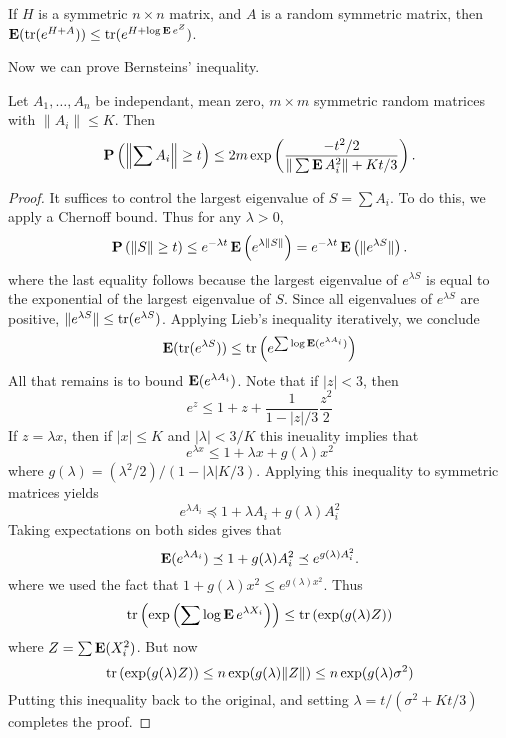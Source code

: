 \begin{corollary}
    If $H$ is a symmetric $n \times n$ matrix, and $A$ is a random symmetric matrix, then $\operatorname{\mathbf{E}}(\operatorname{\text{tr}}(e^{H + A})) \leq \operatorname{\text{tr}}(e^{H + \log \operatorname{\mathbf{E}} e^Z})$.
\end{corollary}

Now we can prove Bernsteins' inequality.

\begin{theorem}
    Let $A_1, \dots, A_n$ be independant, mean zero, $m \times m$ symmetric random matrices with $\| A_i \| \leq K$. Then
    \[ \operatorname{\mathbf{P}} \left( \left\| \sum A_i \right\| \geq t \right) \leq 2m \exp \left( \frac{-t^2/2}{\|\sum \operatorname{\mathbf{E}} A_i^2 \| + Kt/3} \right). \]
\end{theorem}
\begin{proof}
    It suffices to control the largest eigenvalue of $S = \sum A_i$. To do this, we apply a Chernoff bound. Thus for any $\lambda > 0$,
    \[ \operatorname{\mathbf{P}} \left( \| S \| \geq t \right) \leq e^{- \lambda t} \operatorname{\mathbf{E}} \left( e^{\lambda \| S \|} \right) = e^{-\lambda t} \operatorname{\mathbf{E}} \left( \| e^{\lambda S} \| \right). \]
    where the last equality follows because the largest eigenvalue of $e^{\lambda S}$ is equal to the exponential of the largest eigenvalue of $S$. Since all eigenvalues of $e^{\lambda S}$ are positive, $\| e^{\lambda S} \| \leq \operatorname{\text{tr}}(e^{\lambda S})$. Applying Lieb's inequality iteratively, we conclude
    \[ \operatorname{\mathbf{E}}(\operatorname{\text{tr}}(e^{\lambda S})) \leq \operatorname{\text{tr}} \left( e^{\sum \log \operatorname{\mathbf{E}}(e^{\lambda A_i})} \right) \]
    All that remains is to bound $\operatorname{\mathbf{E}}(e^{\lambda A_i})$. Note that if $|z| < 3$, then
    \[ e^z \leq 1 + z + \frac{1}{1 - |z|/3} \frac{z^2}{2} \]
    If $z = \lambda x$, then if $|x| \leq K$ and $|\lambda| < 3/K$ this ineuality implies that
    \[ e^{\lambda x} \leq 1 + \lambda x + g(\lambda) x^2 \]
    where $g(\lambda) = (\lambda^2/2)/(1 - |\lambda|K/3)$. Applying this inequality to symmetric matrices yields
    \[ e^{\lambda A_i} \preceq 1 + \lambda A_i + g(\lambda) A_i^2 \]
    Taking expectations on both sides gives that
    \[ \operatorname{\mathbf{E}}(e^{\lambda A_i}) \preceq 1 + g(\lambda) A_i^2 \preceq e^{g(\lambda) A_i^2}. \]
    where we used the fact that $1 + g(\lambda) x^2 \leq e^{g(\lambda) x^2}$. Thus
    \[ \operatorname{\text{tr}} \left( \exp \left( \sum \log \operatorname{\mathbf{E}} e^{\lambda X_i} \right) \right) \leq \operatorname{\text{tr}} \left( \exp(g(\lambda) Z) \right) \]
    where $Z = \sum \operatorname{\mathbf{E}}(X_i^2)$. But now
    \[ \operatorname{\text{tr}} \left( \exp(g(\lambda) Z) \right) \leq n \exp(g(\lambda) \| Z \|) \leq n \exp(g(\lambda) \sigma^2) \]
    Putting this inequality back to the original, and setting $\lambda = t/(\sigma^2 + Kt/3)$ completes the proof.
\end{proof}

